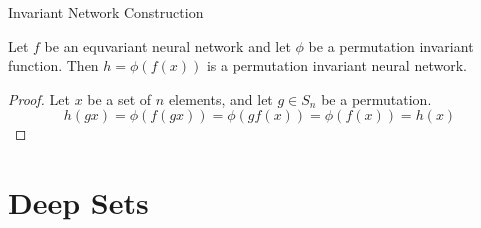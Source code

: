\documentclass{beamer}
\begin{document}
\begin{frame}{Invariant Network Construction}
    \begin{theorem}
        Let $f$ be an equvariant neural network and let $\phi$ be a permutation invariant function. Then $h = \phi(f(x))$ is a permutation invariant neural network.
    \end{theorem}
    \begin{proof}
        Let $x$ be a set of $n$ elements, and let $g \in S_n$ be a permutation.
        \[ h(gx) = \phi(f(gx)) = \phi(gf(x)) = \phi(f(x)) = h(x) \]
    \end{proof}
\end{frame}


\section{Deep Sets}
\end{document}
